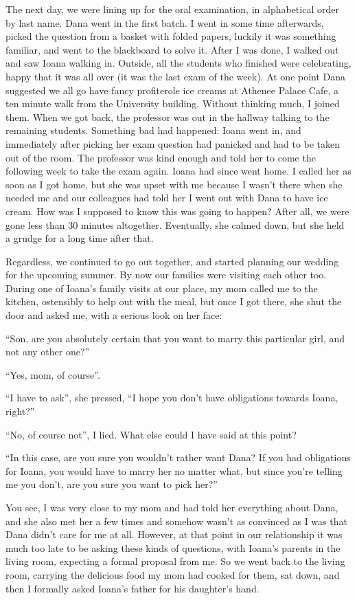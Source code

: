 \documentclass[12pt]{book}
\begin{document}
The next day, we were lining up for the oral examination, in
alphabetical order by last name. Dana went in the first batch. I went
in some time afterwards, picked the question from a basket with folded
papers, luckily it was something familiar, and went to the blackboard to
solve it. After I was done, I walked out and saw Ioana walking in.
Outside, all the students who finished were celebrating, happy that it
was all over (it was the last exam of the week). At one point Dana
suggested we all go have fancy profiterole ice creams at Athenee Palace
Cafe, a ten minute walk from the University building. Without thinking
much, I joined them. When we got back, the professor was out in the
hallway talking to the remaining students. Something bad had happened:
Ioana went in, and immediately after picking her exam question had
panicked and had to be taken out of the room. The professor was kind
enough and told her to come the following week to take the exam again.
Ioana had since went home. I called her as soon as I got home, but she
was upset with me because I wasn't there when she needed me and our
colleagues had told her I went out with Dana to have ice cream. How was
I supposed to know this was going to happen? After all, we were gone
less than 30 minutes altogether. Eventually, she calmed down, but she
held a grudge for a long time after that.

Regardless, we continued to go out together, and started planning our
wedding for the upcoming summer. By now our families were visiting each
other too. During one of Ioana's family visits at our place, my mom
called me to the kitchen, ostensibly to help out with the meal, but once
I got there, she shut the door and asked me, with a serious look on her
face:

``Son, are you absolutely certain that you want to marry this particular
girl, and not any other one?''

``Yes, mom, of course''.

``I have to ask'', she pressed, ``I hope you don't have obligations
towards Ioana, right?''

``No, of course not'', I lied. What else could I have said at this
point?

``In this case, are you sure you wouldn't rather want Dana? If you had
obligations for Ioana, you would have to marry her no matter what, but
since you're telling me you don't, are you sure you want to pick her?''

You see, I was very close to my mom and had told her everything about
Dana, and she also met her a few times and somehow wasn't as convinced
as I was that Dana didn't care for me at all. However, at that point in
our relationship it was much too late to be asking these kinds of
questions, with Ioana's parents in the living room, expecting a formal
proposal from me. So we went back to the living room, carrying the
delicious food my mom had cooked for them, sat down, and then I formally
asked Ioana's father for his daughter's hand.
\end{document}
